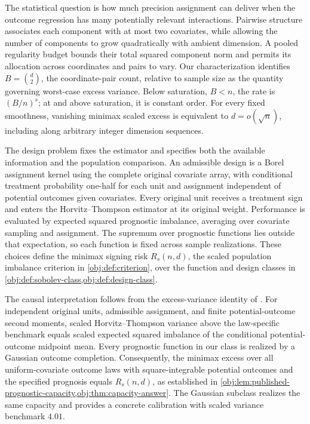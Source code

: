 The statistical question is how much precision assignment can deliver when the outcome regression has many potentially relevant interactions. Pairwise structure associates each component with at most two covariates, while allowing the number of components to grow quadratically with ambient dimension. A pooled regularity budget bounds their total squared component norm and permits its allocation across coordinates and pairs to vary. Our characterization identifies \(B=\binom d2\), the coordinate-pair count, relative to sample size as the quantity governing worst-case excess variance. Below saturation, \(B<n\), the rate is \((B/n)^s\); at and above saturation, it is constant order. For every fixed smoothness, vanishing minimax scaled excess is equivalent to \(d=o(\sqrt n)\), including along arbitrary integer dimension sequences.

The design problem fixes the estimator and specifies both the available information and the population comparison. An admissible design is a Borel assignment kernel using the complete original covariate array, with conditional treatment probability one-half for each unit and assignment independent of potential outcomes given covariates. Every original unit receives a treatment sign and enters the Horvitz--Thompson estimator at its original weight. Performance is evaluated by expected squared prognostic imbalance, averaging over covariate sampling and assignment. The supremum over prognostic functions lies outside that expectation, so each function is fixed across sample realizations. These choices define the minimax signing risk \(R_s(n,d)\), the scaled population imbalance criterion in \cref{obj:def:criterion}, over the function and design classes in \cref{obj:def:sobolev-class,obj:def:design-class}.

The causal interpretation follows from the excess-variance identity of \citet[Proposition 2.3, equation (2.4), under Assumption 2.1 and Definition 2.2]{Cytrynbaum2026Limits}. For independent original units, admissible assignment, and finite potential-outcome second moments, scaled Horvitz--Thompson variance above the law-specific benchmark equals scaled expected squared imbalance of the conditional potential-outcome midpoint mean. Every prognostic function in our class is realized by a Gaussian outcome completion. Consequently, the minimax excess over all uniform-covariate outcome laws with square-integrable potential outcomes and the specified prognosis equals \(R_s(n,d)\), as established in \cref{obj:lem:published-prognostic-capacity,obj:thm:capacity-answer}. The Gaussian subclass realizes the same capacity and provides a concrete calibration with scaled variance benchmark \(4.01\).


